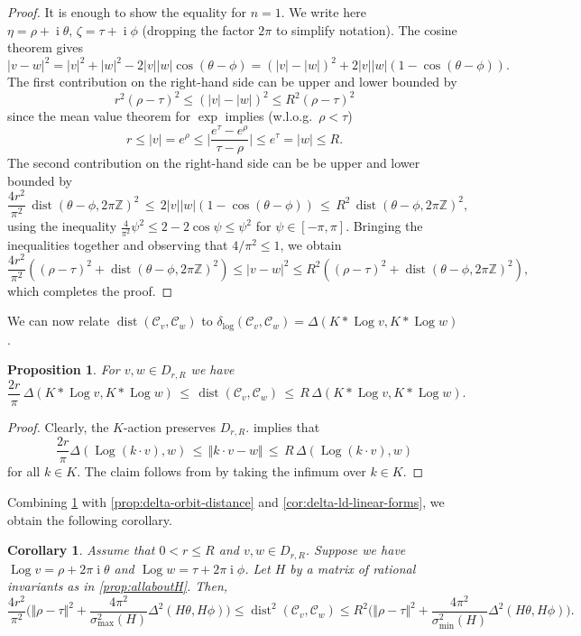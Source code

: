 \documentclass[10pt,a4paper]{article}
\newtheorem{proposition}[theorem]{Proposition}
\newtheorem{corollary}[theorem]{Corollary}
\theoremstyle{definition}
\DeclareMathOperator{\ii}{i}
\DeclareMathOperator{\Log}{Log}
\DeclareMathOperator{\dist}{dist}
\newcommand{\distLD}{\delta_{\log}}
\newcommand{\ZZ}{\mathbb{Z}}
\newcommand{\KK}{\ensuremath{\mathcal{C}}}
\numberwithin{equation}{section}
\begin{document}
\begin{proof}
It is enough to show the equality for $n=1$.
We write here $\eta = \rho+\ii\theta,\, \zeta=\tau+\ii\phi$ (dropping the factor $2\pi$ to simplify notation).
The cosine theorem gives
\[
  |v-w|^2 = |v|^2 + |w|^2 - 2|v||w|\cos(\theta-\phi) = (|v|-|w|)^2 + 2|v||w|\left(1-\cos(\theta-\phi)\right).
\]
The first contribution on the right-hand side can be upper and lower bounded by
\[
	r^2(\rho-\tau)^2\leq (|v|-|w|)^2\leq R^2 (\rho-\tau)^2
\]
since the mean value theorem for $\exp$ implies (w.l.o.g.\ $\rho < \tau$)
$$
 r \le |v| = e^\rho \le \Big|\frac{e^\tau - e^\rho}{\tau - \rho}\Big| \le e^\tau = |w| \le R .
$$
The second contribution on the right-hand side can be be upper and lower bounded by
\[
 \frac{4 r^2}{\pi^2}\,\dist(  \theta-\phi,2\pi\ZZ)^2\, \leq \,
  2|v||w|\left(1-\cos(\theta-\phi)\right)\,\leq \,R^2 \, \dist(  \theta-\phi,2\pi\ZZ)^2,
\]
using the inequality
$\frac{4}{\pi^2}\psi^2\leq 2-2\cos\psi \leq \psi^2$ for $\psi\in[-\pi,\pi]$.
Bringing the inequalities together and observing that $4/\pi^2\leq 1$, we obtain
\[
 \frac{4r^2}{\pi^2} \left( (\rho-\tau)^2 + \dist(  \theta-\phi,2\pi\ZZ)^2 \right)
   \leq |v-w|^2 \leq R^2 \left( (\rho-\tau)^2 + \dist(  \theta-\phi,2\pi\ZZ)^2 \right),
\]
which completes the proof.
\end{proof}

We can now relate %
$\dist(\KK_v,\KK_w)$ to $\distLD(\KK_v,\KK_w)=\Delta(K\ast \Log v, K\ast \Log w)$.

\begin{proposition}
\label{thm:logorbits-equivalence}
For $v,w\in D_{r,R}$ we have
\[
 \frac{2r}{\pi}\, \Delta(K\ast \Log v,K\ast \Log w) \, \leq \, \dist(\KK_v,\KK_w) \, \leq \,
  R\, \Delta(K\ast \Log v,K\ast \Log w).
\]
\end{proposition}

\begin{proof}
Clearly, the $K$-action preserves $D_{r,R}$.
 implies that
\[
 \frac{2r}{\pi} \Delta( \Log( k\cdot v ) , w ) \, \leq \,
  \Vert k\cdot v-w\Vert\, \leq \, R\, \Delta(\Log(k\cdot v), w)
\]
for all $k\in K$. The claim follows from by taking the infimum over $k\in K$.
\end{proof}

Combining \cref{thm:logorbits-equivalence} with
\cref{prop:delta-orbit-distance} and \cref{cor:delta-ld-linear-forms}, 
we obtain the following corollary.

\begin{corollary}\label{cor:K-orbits-approximation}
Assume that $0<r\leq R$ and $v,w\in D_{r,R}$. Suppose we have $\Log v=\rho+2\pi\ii\theta$ and
$\Log w = \tau+2\pi\ii\phi$.
Let $H$ by a matrix of rational invariants as in \cref{prop:allaboutH}. Then,
\[
 \frac{4r^2}{\pi^2} \big(\Vert\rho-\tau\Vert^2 +\frac{4\pi^2}{\sigma^2_{\max}(H) }
  \Delta^2(H\theta,H \phi)\big)  \leq \dist^2(\KK_v,\KK_w)
 \leq  R^2 \big(\Vert\rho-\tau\Vert^2 + \frac{4\pi^2}{\sigma^2_{\min}(H) }
   \Delta^2(H\theta, H\phi) \big) .
\]
\end{corollary}
\end{document}
